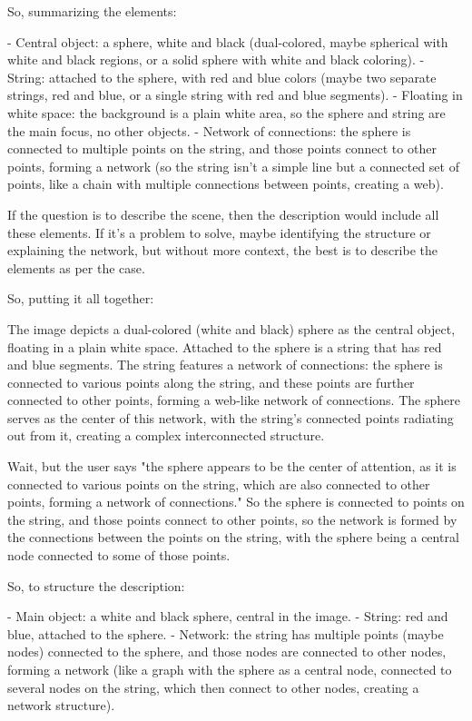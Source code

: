 So, summarizing the elements:

- Central object: a sphere, white and black (dual-colored, maybe spherical with white and black regions, or a solid sphere with white and black coloring).
- String: attached to the sphere, with red and blue colors (maybe two separate strings, red and blue, or a single string with red and blue segments).
- Floating in white space: the background is a plain white area, so the sphere and string are the main focus, no other objects.
- Network of connections: the sphere is connected to multiple points on the string, and those points connect to other points, forming a network (so the string isn't a simple line but a connected set of points, like a chain with multiple connections between points, creating a web).

If the question is to describe the scene, then the description would include all these elements. If it's a problem to solve, maybe identifying the structure or explaining the network, but without more context, the best is to describe the elements as per the case.

So, putting it all together:

The image depicts a dual-colored (white and black) sphere as the central object, floating in a plain white space. Attached to the sphere is a string that has red and blue segments. The string features a network of connections: the sphere is connected to various points along the string, and these points are further connected to other points, forming a web-like network of connections. The sphere serves as the center of this network, with the string's connected points radiating out from it, creating a complex interconnected structure.

Wait, but the user says "the sphere appears to be the center of attention, as it is connected to various points on the string, which are also connected to other points, forming a network of connections." So the sphere is connected to points on the string, and those points connect to other points, so the network is formed by the connections between the points on the string, with the sphere being a central node connected to some of those points.

So, to structure the description:

- Main object: a white and black sphere, central in the image.
- String: red and blue, attached to the sphere.
- Network: the string has multiple points (maybe nodes) connected to the sphere, and those nodes are connected to other nodes, forming a network (like a graph with the sphere as a central node, connected to several nodes on the string, which then connect to other nodes, creating a network structure).

